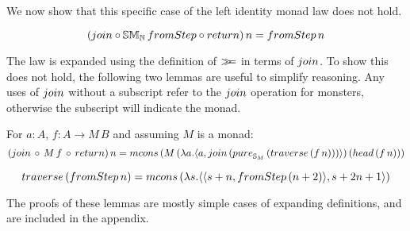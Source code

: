 We now show that this specific case of the left identity monad law does not hold. 

$$
(\join \comp \stmon{\nat}\, \fromstepstr \comp \return)\, n = \fromstepstr\, n
$$



The law is expanded using the definition of $\mathbin{\gg\!\!=}$ in terms of $\join$. 
To show this does not hold, the following two lemmas are useful to simplify reasoning. Any uses of $\join$ without a subscript refer to the $\join$ operation for monsters, otherwise the subscript will indicate the monad.

\begin{lemma}\label{lemma:general_bind_law}
For $a : A$, $f : A \rightarrow M\, B$ and assuming $M$ is a monad:
$$
(\join\, \comp\,  M\, f\, \comp\, \return)\, n = \mcons\, (M\,(\lambda a . \pair{a}{\join\, (\apure_{\stream{M}}\, (\mathsf{traverse}\, (f\, n)))})\, (\head\, (f\, n)))
$$
\end{lemma}
\begin{lemma}\label{lemma:traverse_fromstepstr}
$$
\mathsf{traverse}\, (\fromstepstr\, n) = \mcons\, (\lambda s . \pair{\pair{s+n}{\fromstepstr\, (n + 2)}}{s + 2n + 1})
$$
\end{lemma} 

The proofs of these lemmas are mostly simple cases of expanding definitions, and are included in the appendix.

